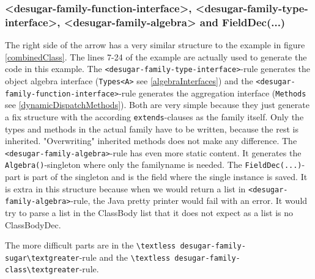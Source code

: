 \documentclass{report}
\begin{document}
\subsubsection{\textless desugar-family-function-interface\textgreater, \textless desugar-family-type-interface\textgreater, \textless desugar-family-algebra\textgreater{} and FieldDec(...)}

The right side of the arrow has a very similar structure to the example in figure \ref{combinedClass}. The lines 7-24 of the example are actually used to generate the code in this example. The \lstinline{<desugar-family-type-interface>}-rule generates the object algebra interface (\lstinline{Types<A>} see \ref{algebraInterfaces}) and the \lstinline{<desugar-family-function-interface>}-rule generates the aggregation interface (\lstinline{Methods} see \ref{dynamicDispatchMethods}). Both are very simple because they just generate a fix structure with the according \lstinline{extends}-clauses as the family itself. Only the types and methods in the actual family have to be written, because the rest is inherited. "Overwriting" inherited methods does not make any difference. The \lstinline{<desugar-family-algebra>}-rule has even more static content. It generates the \lstinline{Algebra()}-singleton where only the familyname is needed. The \lstinline{FieldDec(...)}-part is part of the singleton and is the field where the single instance is saved. It is extra in this structure because when we would return a list in \lstinline{<desugar-family-algebra>}-rule, the Java pretty printer would fail with an error. It would try to parse a list in the ClassBody list that it does not expect as a list is no ClassBodyDec.

The more difficult parts are in the \lstinline{\textless desugar-family-sugar\textgreater}-rule and the \lstinline{\textless desugar-family-class\textgreater}-rule.
\end{document}
